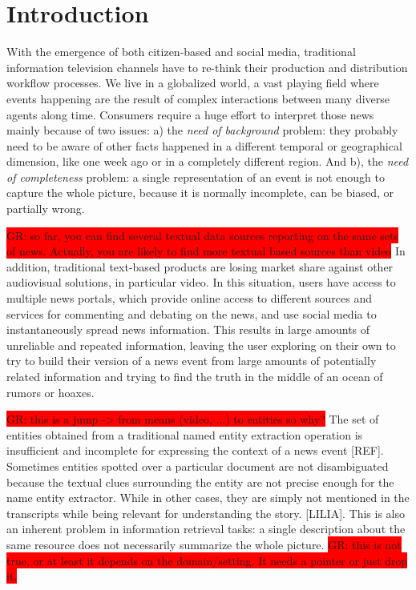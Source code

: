 \documentclass{llncs}
\newcommand{\todo}[1]{\colorbox{red}{#1}}
\begin{document}

\section{Introduction}
\label{sec:introduction}

With the emergence of both citizen-based and social media, traditional information television channels have to re-think their production and distribution workflow processes. We live in a globalized world, a vast playing field where events happening are the result of complex interactions between many diverse agents along time. Consumers require a huge effort to interpret those news mainly because of two issues: a) the \textit{need of background} problem: they probably need to be aware of other facts happened in a different temporal or geographical dimension, like one week ago or in a completely different region. And b), the \textit{need of completeness} problem: a single representation of an event is not enough to capture the whole picture, because it is normally incomplete, can be biased, or partially wrong. 

\todo{GR: so far, you can find several textual data sources reporting on the same sets of news. Actually, you are likely to find more textual based sources than video}
In addition, traditional text-based products are losing market share against other audiovisual solutions, in particular video. In this situation, users have access to multiple news portals, which provide online access to different sources and services for commenting and debating on the news, and use social media to instantaneously spread news information. This results in large amounts of unreliable and repeated information, leaving the user exploring on their own to try to build their version of a news event from large amounts of potentially related information and trying to find the truth in the middle of an ocean of rumors or hoaxes.

\todo{GR: this is a jump -> from means (video, ...) to entities so why?}
The set of entities obtained from a traditional named entity extraction operation is insufficient and incomplete for expressing the context of a news event  [REF]. Sometimes entities spotted over a particular document are not disambiguated because the textual clues surrounding the entity are not precise enough for the name entity extractor. While in other cases, they are simply not mentioned in the transcripts while being relevant for understanding the story. [LILIA]. This is also an inherent problem in information retrieval tasks: a single description about the same resource does not necessarily summarize the whole picture. \todo{GR: this is not true, or at least it depends on the domain/setting. It needs a pointer or just drop it.} 
\end{document}

